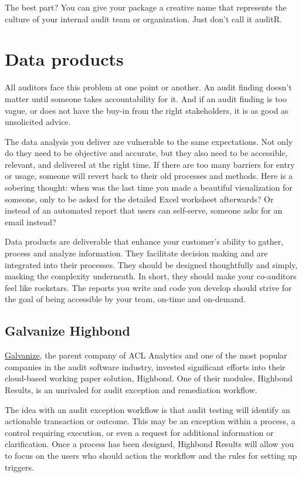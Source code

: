 \documentclass[
]{book}
\begin{document}
The best part? You can give your package a creative name that represents the culture of your internal audit team or organization. Just don't call it auditR.

\hypertarget{data-products}{%
\section{Data products}\label{data-products}}

All auditors face this problem at one point or another. An audit finding doesn't matter until someone takes accountability for it. And if an audit finding is too vague, or does not have the buy-in from the right stakeholders, it is as good as unsolicited advice.

The data analysis you deliver are vulnerable to the same expectations. Not only do they need to be objective and accurate, but they also need to be accessible, relevant, and delivered at the right time. If there are too many barriers for entry or usage, someone will revert back to their old processes and methods. Here is a sobering thought: when was the last time you made a beautiful visualization for someone, only to be asked for the detailed Excel worksheet afterwards? Or instead of an automated report that users can self-serve, someone asks for an email instead?

Data products are deliverable that enhance your customer's ability to gather, process and analyze information. They facilitate decision making and are integrated into their processes. They should be designed thoughtfully and simply, masking the complexity underneath. In short, they should make your co-auditors feel like rockstars. The reports you write and code you develop should strive for the goal of being accessible by your team, on-time and on-demand.

\hypertarget{galvanize-highbond}{%
\subsection{Galvanize Highbond}\label{galvanize-highbond}}

\href{https://www.wegalvanize.com}{Galvanize}, the parent company of ACL Analytics and one of the most popular companies in the audit software industry, invested significant efforts into their cloud-based working paper solution, Highbond. One of their modules, Highbond Results, is an unrivaled for audit exception and remediation workflow.

The idea with an audit exception workflow is that audit testing will identify an actionable transaction or outcome. This may be an exception within a process, a control requiring execution, or even a request for additional information or clarification. Once a process has been designed, Highbond Results will allow you to focus on the users who should action the workflow and the rules for setting up triggers.
\end{document}
